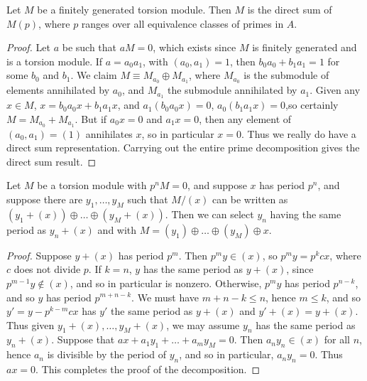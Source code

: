 \begin{theorem}
    Let $M$ be a finitely generated torsion module. Then $M$ is the direct sum of $M(p)$, where $p$ ranges over all equivalence classes of primes in $A$.
\end{theorem}
\begin{proof}
    Let $a$ be such that $aM = 0$, which exists since $M$ is finitely generated and is a torsion module. If $a = a_0a_1$, with $(a_0,a_1) = 1$, then $b_0a_0 + b_1a_1 = 1$ for some $b_0$ and $b_1$. We claim $M \equiv M_{a_0} \oplus M_{a_1}$, where $M_{a_0}$ is the submodule of elements annihilated by $a_0$, and $M_{a_1}$ the submodule annihilated by $a_1$. Given any $x \in M$, $x = b_0a_0x + b_1a_1x$, and $a_1(b_0a_0x) = 0$, $a_0(b_1a_1x) = 0$,so certainly $M = M_{a_0} + M_{a_1}$. But if $a_0 x = 0$ and $a_1 x = 0$, then any element of $(a_0,a_1) = (1)$ annihilates $x$, so in particular $x = 0$. Thus we really do have a direct sum representation. Carrying out the entire prime decomposition gives the direct sum result.
\end{proof}

\begin{lemma}
    Let $M$ be a torsion module with $p^n M = 0$, and suppose $x$ has period $p^n$, and suppose there are $y_1, \dots, y_M$ such that $M/(x)$ can be written as $(y_1 + (x)) \oplus \dots \oplus (y_M + (x))$. Then we can select $y_n$ having the same period as $y_n + (x)$ and with $M = (y_1) \oplus \dots \oplus (y_M) \oplus x$.
\end{lemma}
\begin{proof}
    Suppose $y + (x)$ has period $p^m$. Then $p^m y \in (x)$, so $p^m y = p^k c x$, where $c$ does not divide $p$. If $k = n$, $y$ has the same period as $y + (x)$, since $p^{m-1} y \not \in (x)$, and so in particular is nonzero. Otherwise, $p^m y$ has period $p^{n-k}$, and so $y$ has period $p^{m + n-k}$. We must have $m+n-k \leq n$, hence $m \leq k$, and so $y' = y - p^{k - m} c x$ has $y'$ the same period as $y + (x)$ and $y' + (x) = y + (x)$. Thus given $y_1 + (x), \dots, y_M + (x)$, we may assume $y_n$ has the same period as $y_n + (x)$. Suppose that $ax + a_1y_1 + \dots + a_m y_M = 0$. Then $a_ny_n \in (x)$ for all $n$, hence $a_n$ is divisible by the period of $y_n$, and so in particular, $a_ny_n = 0$. Thus $ax = 0$. This completes the proof of the decomposition.
\end{proof}

